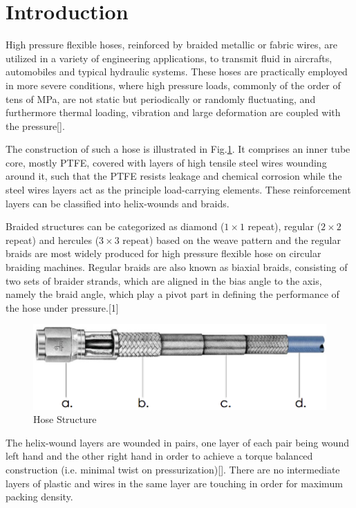 \section{Introduction}
\label{introduction}

High pressure flexible hoses, reinforced by braided metallic or fabric wires, are utilized in a variety of engineering applications, to transmit fluid in aircrafts, automobiles and typical hydraulic systems. 
These hoses are practically employed in more severe conditions, where high pressure loads, commonly of the order of tens of MPa,  are not static but periodically or randomly fluctuating, and furthermore thermal loading, vibration and large deformation are coupled with the pressure[]. 



The construction of such a hose is illustrated in Fig.\ref{fig:Hose-Structure}. It comprises an inner tube core, mostly PTFE, covered with layers of high tensile steel wires wounding around it, such that the PTFE resists leakage and chemical corrosion while the steel wires layers act as the principle load-carrying elements. These reinforcement layers can be classified into helix-wounds and braids. 



Braided structures can be categorized as diamond ($ 1 \times 1 $ repeat), regular ($ 2 \times 2 $ repeat) and hercules ($ 3 \times 3 $ repeat) based on the weave pattern \cite{Rawal:2015dq}  and the regular braids are most widely produced for high pressure flexible hose on circular braiding machines.
Regular braids  are also known as biaxial braids, consisting of two sets of braider strands, which are aligned in the bias angle to the axis, namely the braid angle, which play a pivot part in defining the performance of the hose under pressure.[1]

\begin{figure}[h]
\centering
\includegraphics[width=0.7\linewidth]{figures/Hose-Structure}
\caption{Hose Structure}
\label{fig:Hose-Structure}
\end{figure}


The helix-wound layers are wounded in pairs, one layer of each pair being wound left hand and the other right hand in order to achieve a torque balanced construction (i.e. minimal twist on pressurization)[]. There are no intermediate layers of plastic and wires in the same layer are touching in order for maximum packing density.



